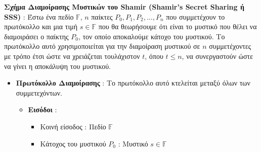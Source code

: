 \begin{definition}
\textbf{Σχήμα Διαμοίρασης Μυστικών του Shamir (Shamir's Secret Sharing ή SSS)} : Έστω ένα πεδίο $\mathbb{F}$, $n$ παίκτες $P_0, P_1, P_2, \ldots, P_n$ που συμμετέχουν το πρωτόκολλο και μια τιμή $s \in \mathbb{F}$ που θα θεωρήσουμε ότι είναι το μυστικό που θέλει να διαμοιράσει ο παίκτης $P_0$, τον οποίο αποκαλούμε κάτοχο του μυστικού. Το πρωτόκολλο αυτό χρησιμοποιείται για την διαμοίραση  μυστικού σε $n$ συμμετέχοντες με τρόπο έτσι ώστε να χρειάζεται τουλάχιστον $t$, όπου $t \le n$, να συνεργαστούν ώστε να γίνει η αποκάλυψη του μυστικού.

\begin{itemize}
    \item \textbf{Πρωτόκολλο Διαμοίρασης} : Το πρωτόκολλο αυτό κτελείται μεταξύ όλων των συμμετεχόντων.
    \begin{itemize}
        \item \textbf{Εισόδοι} :
            \begin{itemize}
                \item Κοινή είσοδος : Πεδίο $\mathbb{F}$
                \item Κάτοχος του μυστικού $P_0$ : Μυστικό $s \in \mathbb{F}$
            \end{itemize}
        

\end{itemize}
\end{itemize}
\end{definition}
